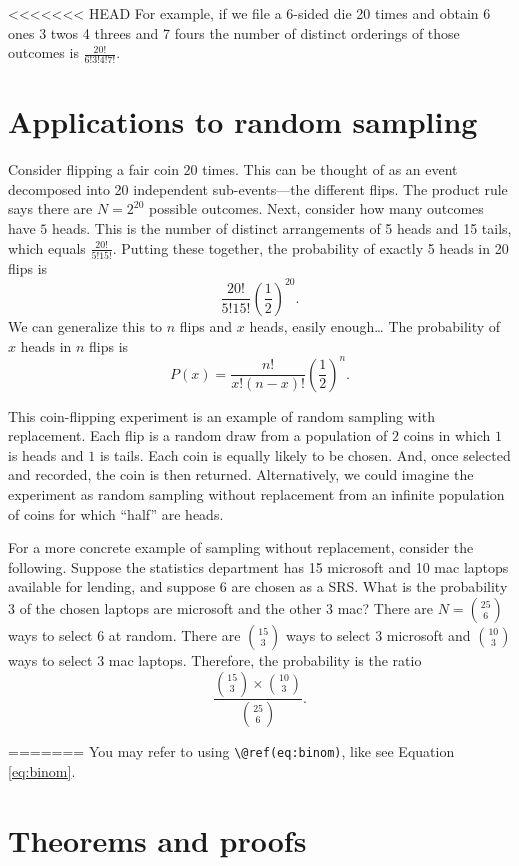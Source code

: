 \documentclass[]{book}
\begin{document}
<<<<<<< HEAD
For example, if we file a 6-sided die 20 times and obtain 6 ones 3 twos
4 threes and 7 fours the number of distinct orderings of those outcomes
is \(\frac{20!}{6!3!4!7!}\).

\section{Applications to random
sampling}\label{applications-to-random-sampling}

Consider flipping a fair coin \(20\) times. This can be thought of as an
event decomposed into 20 independent sub-events---the different flips.
The product rule says there are \(N = 2^{20}\) possible outcomes. Next,
consider how many outcomes have \(5\) heads. This is the number of
distinct arrangements of 5 heads and 15 tails, which equals
\(\frac{20!}{5!15!}\). Putting these together, the probability of
exactly 5 heads in 20 flips is \[\frac{20!}{5!15!}(\frac{1}{2})^{20}.\]
We can generalize this to \(n\) flips and \(x\) heads, easily
enough\ldots{} The probability of \(x\) heads in \(n\) flips is
\[P(x) = \frac{n!}{x!(n-x)!}(\frac{1}{2})^n.\]

This coin-flipping experiment is an example of random sampling with
replacement. Each flip is a random draw from a population of \(2\) coins
in which \(1\) is heads and \(1\) is tails. Each coin is equally likely
to be chosen. And, once selected and recorded, the coin is then
returned. Alternatively, we could imagine the experiment as random
sampling without replacement from an infinite population of coins for
which ``half'' are heads.

For a more concrete example of sampling without replacement, consider
the following. Suppose the statistics department has 15 microsoft and 10
mac laptops available for lending, and suppose 6 are chosen as a SRS.
What is the probability 3 of the chosen laptops are microsoft and the
other 3 mac? There are \(N = {25 \choose 6}\) ways to select 6 at
random. There are \({15 \choose 3}\) ways to select 3 microsoft and
\({10 \choose 3}\) ways to select \(3\) mac laptops. Therefore, the
probability is the ratio
\[\frac{{15 \choose 3}\times {10 \choose 3}}{{25 \choose 6}}.\]

=======
You may refer to using \texttt{\textbackslash{}@ref(eq:binom)}, like see
Equation \eqref{eq:binom}.

\section{Theorems and proofs}\label{theorems-and-proofs}
\end{document}

